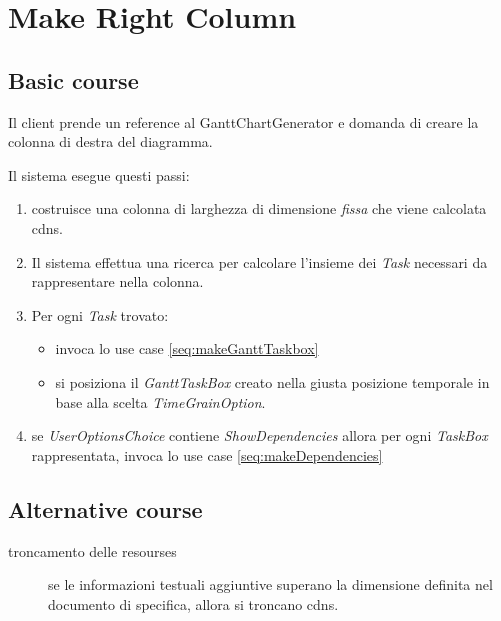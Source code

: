 \section{Make Right Column}
\label{seq:GanttRightRepresentation}
\subsection{Basic course}
Il client prende un reference al GanttChartGenerator e domanda di creare la
colonna di destra del diagramma. 

Il sistema esegue questi passi:
\begin{enumerate}
  \item costruisce una colonna di larghezza di dimensione \emph{fissa} che
  viene calcolata cdns.
  \item Il sistema effettua una ricerca per calcolare l'insieme dei \emph{Task}
  necessari da rappresentare nella colonna.
  \item Per ogni \emph{Task} trovato:
  \begin{itemize}
    \item invoca lo use case \ref{seq:makeGanttTaskbox}
    
    \item si posiziona il \emph{GanttTaskBox} creato nella giusta posizione
    temporale in base alla scelta \emph{TimeGrainOption}.
  \end{itemize}
  \item se \emph{UserOptionsChoice} contiene \emph{ShowDependencies} allora per
  ogni \emph{TaskBox} rappresentata, invoca lo use case 
  \ref{seq:makeDependencies}
\end{enumerate}

\subsection{Alternative course}
\begin{description}
\item[troncamento delle resourses] se le informazioni testuali aggiuntive
superano la dimensione definita nel documento di specifica, allora si troncano
cdns.

\end{description}